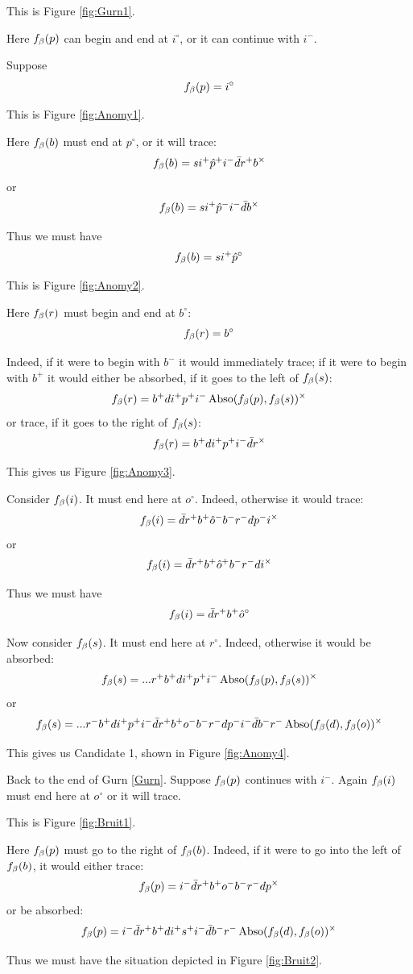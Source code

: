 This is Figure \ref{fig:Gurn1}.

Here $f_\beta(p)$ can begin and end at $i^\circ$, or it can continue with $i^-$.

\label{Anomy}
Suppose
\[
f_\beta(p) = i^\circ
\]

This is Figure \ref{fig:Anomy1}.

Here $f_\beta(b)$ must end at $p^\circ$, or it will trace:
\[
f_\beta(b) = s i^+ \hat{p}^+ i^- \bar{d} r^+ b^\times
\]
or
\[
f_\beta(b) = s i^+ \hat{p}^- i^- \bar{d} b^\times
\]

Thus we must have
\[
f_\beta(b) = s i^+ \hat{p}^\circ
\]

This is Figure \ref{fig:Anomy2}.

Here $f_\beta(r)$ must begin and end at $b^\circ$:
\[
f_\beta(r) = b^\circ
\]

Indeed, if it were to begin with $b^-$ it would immediately trace; if it were to begin with $b^+$ it would either be absorbed, if it goes to the left of $f_\beta(s)$:
\[
f_\beta(r) = b^+ d i^+ p^+ i^- \operatorname{Abso}(f_\beta(p), f_\beta(s))^\times
\]
or trace, if it goes to the right of $f_\beta(s)$:
\[
f_\beta(r) = b^+ d i^+ p^+ i^- \bar{d} r^\times
\]

This gives us Figure \ref{fig:Anomy3}.

Consider $f_\beta(i)$. It must end here at $o^\circ$. Indeed, otherwise it would trace:
\[
f_\beta(i) = \bar{d} r^+ b^+ \hat{o}^- b^- r^- d p^- i^\times
\]
or
\[
f_\beta(i) = \bar{d} r^+ b^+ \hat{o}^+ b^- r^- d i^\times
\]

Thus we must have 
\[
f_\beta(i) = \bar{d} r^+ b^+ \hat{o}^\circ
\]

Now consider $f_\beta(s)$. It must end here at $r^\circ$. Indeed, otherwise it would be absorbed:
\[
f_\beta(s) =...r^+ b^+ d i^+ p^+ i^- \operatorname{Abso}(f_\beta(p), f_\beta(s))^\times
\]
or
\[
f_\beta(s) =...r^- b^+ d i^+ p^+ i^- \bar{d} r^+ b^+ o^- b^- r^- d p^- i^- \bar{d} b^- r^- \operatorname{Abso}(f_\beta(d), f_\beta(o))^\times
\]


This gives us Candidate 1, shown in Figure \ref{fig:Anomy4}.

\label{Bruit}
Back to the end of Gurn \ref{Gurn}. Suppose $f_\beta(p)$ continues with $i^-$. Again $f_\beta(i)$ must end here at $o^\circ$ or it will trace.

This is Figure \ref{fig:Bruit1}.

Here $f_\beta(p)$ must go to the right of $f_\beta(b)$. Indeed, if it were to go into the left of $f_\beta(b)$, it would either trace:
\[
f_\beta(p) = i^- \bar{d} r^+ b^+ o^- b^- r^- d p^\times
\]
or be absorbed:
\[
f_\beta(p) = i^- \bar{d} r^+ b^+ d i^+ s^+ i^- \bar{d} b^- r^- \operatorname{Abso}(f_\beta(d), f_\beta(o))^\times
\]

Thus we must have the situation depicted in Figure \ref{fig:Bruit2}.


